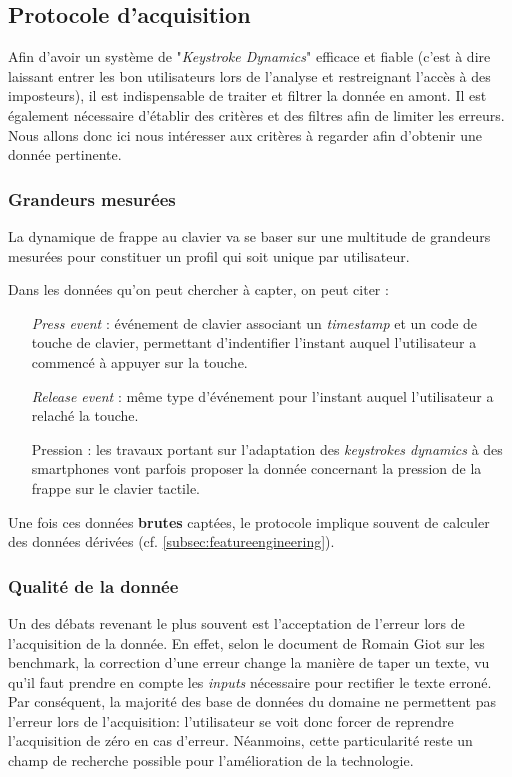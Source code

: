 \subsection{Protocole d'acquisition}

Afin d'avoir un système de "\textit{Keystroke Dynamics}" efficace et fiable (c'est à dire laissant entrer les bon utilisateurs lors de l'analyse et restreignant l'accès à des imposteurs), il est indispensable de traiter et filtrer la donnée en amont. Il est également nécessaire d'établir des critères et des filtres afin de limiter les erreurs. Nous allons donc ici nous intéresser aux critères à regarder afin d'obtenir une donnée pertinente.

\subsubsection{Grandeurs mesurées}
La dynamique de frappe au clavier va se baser sur une multitude de grandeurs mesurées pour constituer un profil qui soit unique par utilisateur\cite{giotThese,Hu2008,gunetti2005,bergadano2002}.

Dans les données qu'on peut chercher à capter, on peut citer :

\begin{itemize}
	\item[\textit{Press event}] : événement de clavier associant un \textit{timestamp} et un code de touche de clavier, permettant d'indentifier l'instant auquel l'utilisateur a commencé à appuyer sur la touche.
	\item[\textit{Release event}] : même type d'événement pour l'instant auquel l'utilisateur a relaché la touche.
	\item[Pression] : les travaux portant sur l'adaptation des \textit{keystrokes dynamics} à des smartphones vont parfois proposer la donnée concernant la pression de la frappe sur le clavier tactile.
\end{itemize}

Une fois ces données \textbf{brutes} captées, le protocole implique souvent de calculer des données dérivées (cf. \ref{subsec:featureengineering}).

\subsubsection{Qualité de la donnée}

Un des débats revenant le plus souvent est l'acceptation de l'erreur lors de l'acquisition de la donnée. En effet, selon le document de Romain Giot sur les benchmark\cite{giotBenchmark}, la correction d'une erreur change la manière de taper un texte, vu qu'il faut  prendre en compte les \textit{inputs} nécessaire pour rectifier le texte erroné. Par conséquent, la majorité des base de données du domaine ne permettent pas l'erreur lors de l'acquisition: l'utilisateur se voit donc forcer de reprendre l'acquisition de zéro en cas d'erreur. Néanmoins, cette particularité reste un champ de recherche possible pour l'amélioration de la technologie.

